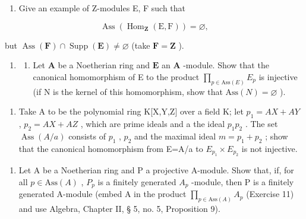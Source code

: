 \begin{enumerate}
\def\labelenumi{(\alph{enumi})}
\setcounter{enumi}{1}
\tightlist
\item
  Give an example of Z-modules E, F such that
\end{enumerate}

\[
\operatorname{Ass} \left(\operatorname{Hom} _ {\mathbf {Z}} (\mathrm{E}, \mathrm{F})\right) = \varnothing ,
\]

but \(\operatorname{Ass}(\mathbf{F}) \cap \operatorname{Supp}(\mathbf{E}) \neq \varnothing\) (take \(\mathbf{F} = \mathbf{Z}\) ).

\begin{enumerate}
\def\labelenumi{\arabic{enumi}.}
\setcounter{enumi}{10}
\tightlist
\item
  \begin{enumerate}
  \def\labelenumii{(\alph{enumii})}
  \tightlist
  \item
    Let \(\mathbf{A}\) be a Noetherian ring and \(\mathbf{E}\) an \(\mathbf{A}\) -module. Show that the canonical homomorphism of E to the product \(\prod_{p\in\text{Ass}(E)}E_p\) is injective (if N is the kernel of this homomorphism, show that \(\text{Ass}(N)=\varnothing\) ).
  \end{enumerate}
\end{enumerate}

\begin{enumerate}
\def\labelenumi{(\alph{enumi})}
\setcounter{enumi}{1}
\tightlist
\item
  Take A to be the polynomial ring K{[}X,Y,Z{]} over a field K; let \(p_{1}=AX+AY\) , \(p_{2}=AX+AZ\) , which are prime ideals and a the ideal \(p_{1}p_{2}\) . The set \(\operatorname{Ass}(A/a)\) consists of \(p_{1}\) , \(p_{2}\) and the maximal ideal \(m=p_{1}+p_{2}\) ; show that the canonical homomorphism from E=A/a to \(E_{p_{1}}\times E_{p_{2}}\) is not injective.
\end{enumerate}

\begin{enumerate}
\def\labelenumi{\arabic{enumi}.}
\setcounter{enumi}{11}
\tightlist
\item
  Let A be a Noetherian ring and P a projective A-module. Show that, if, for all \(p \in \text{Ass}(A)\) , \(P_{p}\) is a finitely generated \(A_{p}\) -module, then P is a finitely generated A-module (embed A in the product \(\prod_{p \in \text{Ass}(A)} A_{p}\) (Exercise 11) and use Algebra, Chapter II, § 5, no. 5, Proposition 9).
\end{enumerate}

